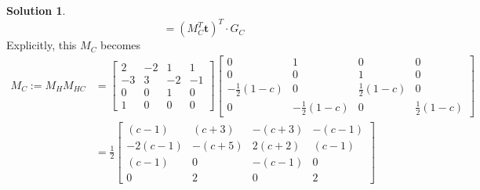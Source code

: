 \documentclass[10pt]{article}
\theoremstyle{plain}
\theoremstyle{definition}
\newtheorem*{soln*}{Solution}
\numberwithin{equation}{section}
\begin{document}
\begin{soln*}
\[                        = (M_C^T \bm{t})^T \cdot G_C
        \]
        Explicitly, this $M_C$ becomes
    \begin{align*}
            M_C := M_H M_{HC}
            &= \begin{bmatrix}
                2 & {-2} & 1 & 1 \\
                {-3} & 3 & {-2} & -1 \\
                0 & 0 & 1 & 0 \\
                1 & 0 & 0 & 0 \end{bmatrix}
            \begin{bmatrix}
                0 & 1 & 0 & 0 \\
                0 & 0 & 1 & 0 \\
                -\frac{1}{2}(1-c) & 0 & \frac{1}{2}(1-c) & 0 \\
                0 & -\frac{1}{2}(1-c) & 0 & \frac{1}{2}(1-c)
            \end{bmatrix} \\
            &= 
            \frac{1}{2} \begin{bmatrix}
                (c-1)   & (c+3)     & -(c+3)    & -(c-1)    \\
                -2(c-1) & -(c+5)    & 2(c+2)    & (c-1)     \\
                (c-1)   & 0         & -(c-1)    & 0         \\
                0       & 2         & 0         & 2
            \end{bmatrix}
    \end{align*}
    

\end{soln*}
\end{document}
